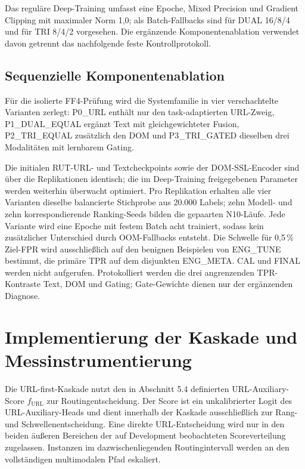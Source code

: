 Das reguläre Deep-Training umfasst eine Epoche, Mixed Precision und Gradient Clipping mit
maximaler Norm 1,0; als Batch-Fallbacks sind für DUAL 16/8/4 und für TRI 8/4/2 vorgesehen.
Die ergänzende Komponentenablation verwendet davon getrennt das nachfolgende feste
Kontrollprotokoll.

\subsection{Sequenzielle Komponentenablation}

Für die isolierte FF4-Prüfung wird die Systemfamilie in vier verschachtelte Varianten zerlegt:
P0\_URL enthält nur den task-adaptierten URL-Zweig, P1\_DUAL\_EQUAL ergänzt Text mit
gleichgewichteter Fusion, P2\_TRI\_EQUAL zusätzlich den DOM und P3\_TRI\_GATED dieselben
drei Modalitäten mit lernbarem Gating.

Die initialen RUT-URL- und Textcheckpoints sowie der DOM-SSL-Encoder sind über die
Replikationen identisch; die im Deep-Training freigegebenen Parameter werden weiterhin
überwacht optimiert. Pro Replikation erhalten alle vier Varianten dieselbe balancierte
Stichprobe aus 20.000 Labels; zehn Modell- und zehn korrespondierende Ranking-Seeds bilden
die gepaarten N10-Läufe. Jede Variante wird eine Epoche mit festem Batch acht trainiert,
sodass kein zusätzlicher Unterschied durch OOM-Fallbacks entsteht. Die Schwelle für
0,5\,\% Ziel-FPR wird ausschließlich auf den benignen Beispielen von ENG\_TUNE bestimmt,
die primäre TPR auf dem disjunkten ENG\_META. CAL und FINAL werden nicht aufgerufen.
Protokolliert werden die drei angrenzenden TPR-Kontraste Text, DOM und Gating;
Gate-Gewichte dienen nur der ergänzenden Diagnose.

\section{Implementierung der Kaskade und Messinstrumentierung}

Die URL-first-Kaskade nutzt den in Abschnitt 5.4 definierten URL-Auxiliary-Score
$f_{\mathrm{URL}}$ zur Routingentscheidung. Der Score ist ein unkalibrierter Logit des
URL-Auxiliary-Heads und dient innerhalb der Kaskade ausschließlich zur Rang- und
Schwellenentscheidung. Eine direkte URL-Entscheidung wird nur in den beiden äußeren
Bereichen der auf Development beobachteten Scoreverteilung zugelassen. Instanzen im
dazwischenliegenden Routingintervall werden an den vollständigen multimodalen Pfad
eskaliert.

